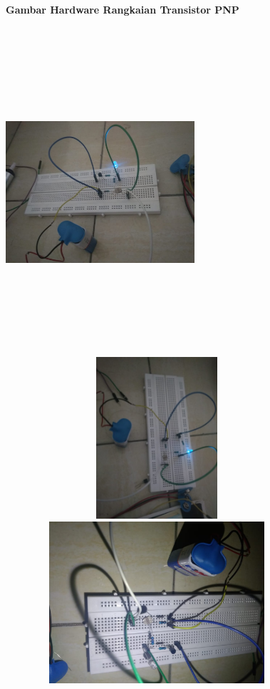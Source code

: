 \documentclass[12pt,a4paper]{article}
\begin{document}
\newpage
\begin{figure}
\paragraph{Gambar Hardware Rangkaian Transistor PNP}
\paragraph{ }
\begin{center}

\includegraphics[width=7cm, height=12cm]{g7.png}

\includegraphics[width=12cm, height=6cm]{g8.png}

\includegraphics[width=12cm, height=6cm]{g9.png}
\end{center}
\end{figure}
\vspace{2cm}
\end{document}
